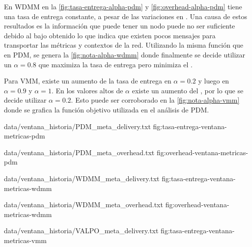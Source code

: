 En WDMM en la \ref{fig:tasa-entrega-alpha-pdm} y \ref{fig:overhead-alpha-pdm}
tiene una tasa de entrega constante, a pesar de las variaciones en \overhead.
Una causa de estos resultados es la información que puede tener un nodo puede no
ser suficiente debido al bajo \overhead{} obtenido lo que indica que existen
pocos mensajes para transportar las métricas y contextos de la red. Utilizando
la misma función que en PDM, se genera la \ref{fig:nota-alpha-wdmm} donde
finalmente se decide utilizar un $\alpha = 0.8$ que maximiza la tasa de entrega
pero minimiza el \overhead.


Para VMM, existe un aumento de la tasa de entrega en $\alpha = 0.2$ y luego en
$\alpha = 0.9$ y $\alpha = 1$. En los valores altos de $\alpha$ existe un
aumento del \overhead, por lo que se decide utilizar $\alpha = 0.2$. Esto puede
ser corroborado en la \ref{fig:nota-alpha-vmm} donde se grafica la función
objetivo utilizada en el análisis de PDM.





\newpage
{}





{
{data/ventana_historia/PDM_meta_delivery.txt}
}{fig:tasa-entrega-ventana-metricas-pdm}


{
{data/ventana_historia/PDM_meta_overhead.txt}
}{fig:overhead-ventana-metricas-pdm}


{
{data/ventana_historia/WDMM_meta_delivery.txt}
}{fig:tasa-entrega-ventana-metricas-wdmm}

{
{data/ventana_historia/WDMM_meta_overhead.txt}
}{fig:overhead-ventana-metricas-wdmm}


{
{data/ventana_historia/VALPO_meta_delivery.txt}
}{fig:tasa-entrega-ventana-metricas-vmm}


